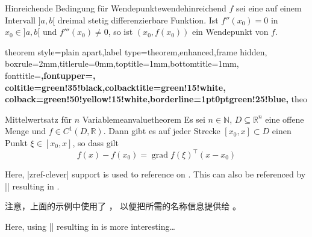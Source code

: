 \begin{dispExample}
\begin{Theorem}[boxrule=2mm,toptitle=-1.5mm,bottomtitle=-1.5mm]{%
    Hinreichende Bedingung f\"{u}r Wendepunkte}{wendehinreichend}%
  $f$ sei eine auf einem Intervall $]a,b[$ dreimal stetig differenzierbare Funktion.
  Ist $f''(x_0)=0$ in $x_0\in]a,b[$ und $f'''(x_0)\ne 0$, so ist
  $(x_0,f(x_0))$ ein Wendepunkt von $f$.
\end{Theorem}
\end{dispExample}

\begin{dispExample}
%
  {theorem style=plain apart,label type=theorem,enhanced,frame hidden,
  boxrule=2mm,titlerule=0mm,toptitle=1mm,bottomtitle=1mm,
  fonttitle=\bfseries\large,fontupper=\normalsize,
  coltitle=green!35!black,colbacktitle=green!15!white,
  colback=green!50!yellow!15!white,borderline={1pt}{0pt}{green!25!blue},
  }{theo}

\begin{YetAnotherTheorem}{Mittelwertsatz f\"{u}r $n$ Variable}{meanvaluetheorem}%
  Es sei $n\in\mathbb{N}$, $D\subseteq\mathbb{R}^n$ eine offene Menge und
  $f\in C^{1}(D,\mathbb{R})$. Dann gibt es auf jeder Strecke
  $[x_0,x]\subset D$ einen Punkt $\xi\in[x_0,x]$, so dass gilt
  \begin{equation*}
  f(x)-f(x_0) = \operatorname{grad} f(\xi)^{\top}(x-x_0)
  \end{equation*}
\end{YetAnotherTheorem}

\medskip
Here, |zref-clever| support is used to reference 
on . This 
can also be referenced by |\zvref| resulting in .
\end{dispExample}

\begin{marker}
注意，上面的示例中使用了 ，
以便把所需的名称信息提供给  \cite{barros:zref-clever}。
\end{marker}

\clearpage

\begin{dispExample}
Here, using |\zvref| resulting in 
is more interesting\ldots
\end{dispExample}



